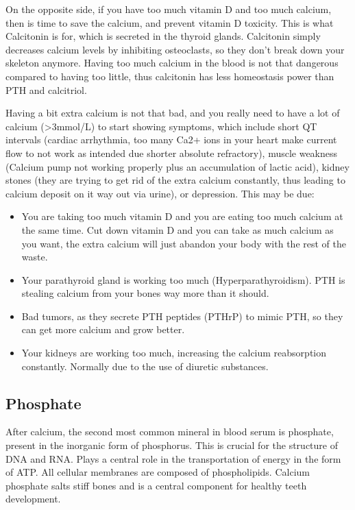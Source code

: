 On the opposite side, if you have too much vitamin D and too much calcium, then is time to save the calcium, and prevent vitamin D toxicity. This is what Calcitonin is for, which is secreted in the thyroid glands. Calcitonin simply decreases calcium levels by inhibiting osteoclasts, so they don't break down your skeleton anymore. Having too much calcium in the blood is not that dangerous compared to having too little, thus calcitonin has less homeostasis power than PTH and calcitriol.

Having a bit extra calcium is not that bad, and you really need to have a lot of calcium (>3mmol/L) to start showing symptoms, which include short QT intervals (cardiac arrhythmia, too many Ca2+ ions in your heart make current flow to not work as intended due shorter absolute refractory), muscle weakness (Calcium pump not working properly plus an accumulation of lactic acid), kidney stones (they are trying to get rid of the extra calcium constantly, thus leading to calcium deposit on it way out via urine), or depression. This may be due:

\begin{itemize}

    \item  You are taking too much vitamin D and you are eating too much calcium at the same time. Cut down vitamin D and you can take as much calcium as you want, the extra calcium will just abandon your body with the rest of the waste.
    
    \item  Your parathyroid gland is working too much (Hyperparathyroidism). PTH is stealing calcium from your bones way more than it should.
    
    \item  Bad tumors, as they secrete PTH peptides (PTHrP) to mimic PTH, so they can get more calcium and grow better.
    
    \item  Your kidneys are working too much, increasing the calcium reabsorption constantly. Normally due to the use of diuretic substances.
    
\end{itemize}


\subsection{Phosphate}

After calcium, the second most common mineral in blood serum is phosphate, present in the inorganic form of phosphorus. This is crucial for the structure of DNA and RNA. Plays a central role in the transportation of energy in the form of ATP. All cellular membranes are composed of phospholipids. Calcium phosphate salts stiff bones and is a central component for healthy teeth development.

